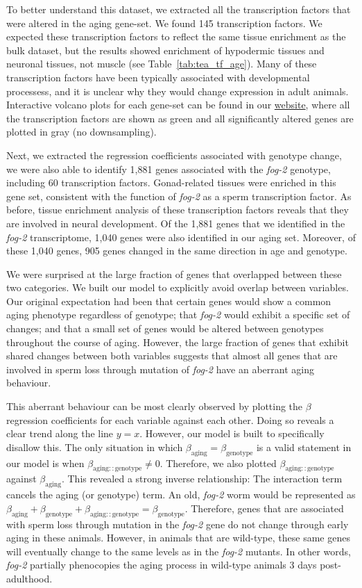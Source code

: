 \documentclass[9pt,twocolumn,twoside]{gsag3jnl}
\newcommand{\fog}{\emph{fog-2}}
\newcommand{\fogn}{1,881}
\newcommand{\coexpressed}{905}
\newcommand{\intersectn}{1,040}
\newcommand{\tfaging}{145}
\newcommand{\tffog}{60}
\newcommand{\webref}{\href{https://wormlabcaltech.github.io/Angeles_And_Leighton_2016/}{website}}
\begin{document}
To better understand this dataset, we extracted all the transcription factors that were altered in the aging gene-set. We found \tfaging{} transcription factors. We expected these transcription factors to reflect the same tissue enrichment as the bulk dataset, but the results showed enrichment of hypodermic tissues and neuronal tissues, not muscle (see Table~\ref{tab:tea_tf_age}). Many of these transcription factors have been typically associated with developmental processess, and it is unclear why they would change expression in adult animals. Interactive volcano plots for each gene-set can be found in our \webref{}, where all the transcription factors are shown as green and all significantly altered genes are plotted in gray (no downsampling).

Next, we extracted the regression coefficients associated with genotype change, we were also able to identify \fogn{} genes associated with the \fog{} genotype, including \tffog{} transcription factors. Gonad-related tissues were enriched in this gene set, consistent with the function of \fog{} as a sperm transcription factor. As before, tissue enrichment analysis of these transcription factors reveals that they are involved in neural development. Of the \fogn{} genes that we identified in the \fog{} transcriptome, \intersectn{} genes were also identified in our aging set. Moreover, of these \intersectn{}  genes, \coexpressed{} genes changed in the same direction in age and genotype.

We were surprised at the large fraction of genes that overlapped between these two categories. We built our model to explicitly avoid overlap between variables. Our original expectation had been that certain genes would show a common aging phenotype regardless of genotype; that \fog{} would exhibit a specific set of changes; and that a small set of genes would be altered between genotypes throughout the course of aging. However, the large fraction of genes that exhibit shared changes between both variables suggests that almost all genes that are involved in sperm loss through mutation of \fog{} have an aberrant aging behaviour.

This aberrant behaviour can be most clearly observed by plotting the $\beta$ regression coefficients for each variable against each other. Doing so reveals a clear trend along the line $y=x$. However, our model is built to specifically disallow this. The only situation in which $\beta_\mathrm{aging} = \beta_\mathrm{genotype}$ is a valid statement in our model is when $\beta_\mathrm{aging::genotype} \neq 0$. Therefore, we also plotted $\beta_\mathrm{aging::genotype}$ against $\beta_\mathrm{aging}$. This revealed a strong inverse relationship: The interaction term cancels the aging (or genotype) term. An old, \fog{} worm would be represented as
$\beta_\mathrm{aging} +\beta_\mathrm{genotype} + \beta_\mathrm{aging::genotype} = \beta_\mathrm{genotype}$.
Therefore, genes that are associated with sperm loss through mutation in the \fog{} gene do not change through early aging in these animals. However, in animals that are wild-type, these same genes will eventually change to the same levels as in the \fog{} mutants. In other words, \fog{} partially phenocopies the aging process in wild-type animals 3 days post-adulthood.
\end{document}
